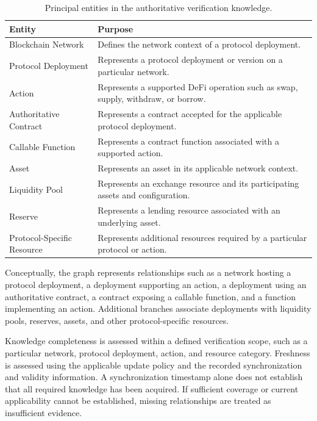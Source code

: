 \begin{table}[H]
\centering
\caption{Principal entities in the authoritative verification knowledge.}
\label{tab:graph_entities}
\small
\begin{tabular}{p{} p{}}
\hline
\textbf{Entity} & \textbf{Purpose} \\
\hline

Blockchain Network &
Defines the network context of a protocol deployment. \\

Protocol Deployment &
Represents a protocol deployment or version on a particular network. \\

Action &
Represents a supported DeFi operation such as swap, supply, withdraw, or
borrow. \\

Authoritative Contract &
Represents a contract accepted for the applicable protocol deployment. \\

Callable Function &
Represents a contract function associated with a supported action. \\

Asset &
Represents an asset in its applicable network context. \\

Liquidity Pool &
Represents an exchange resource and its participating assets and
configuration. \\

Reserve &
Represents a lending resource associated with an underlying asset. \\

Protocol-Specific Resource &
Represents additional resources required by a particular protocol or action. \\

\hline
\end{tabular}
\end{table}

Conceptually, the graph represents relationships such as a network hosting a
protocol deployment, a deployment supporting an action, a deployment using an
authoritative contract, a contract exposing a callable function, and a function
implementing an action. Additional branches associate deployments with
liquidity pools, reserves, assets, and other protocol-specific resources.

Knowledge completeness is assessed within a defined verification scope,
such as a particular network, protocol deployment, action, and resource
category. Freshness is assessed using the applicable update policy and
the recorded synchronization and validity information. A synchronization
timestamp alone does not establish that all required knowledge has been
acquired. If sufficient coverage or current applicability cannot be
established, missing relationships are treated as insufficient evidence.




